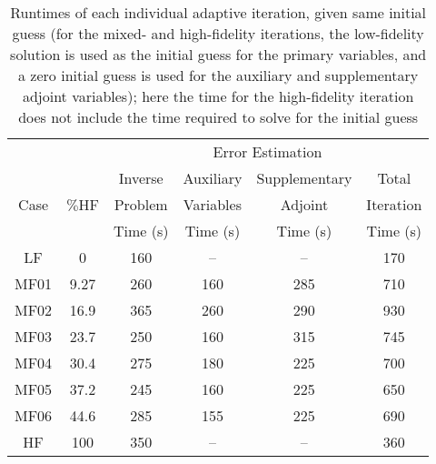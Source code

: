 \begin{table}
\caption{Runtimes of each individual adaptive iteration, given same initial guess (for the mixed- and high-fidelity iterations, the low-fidelity solution is used as the initial guess for the primary variables, and a zero initial guess is used for the auxiliary and supplementary adjoint variables); here the time for the high-fidelity iteration does not include the time required to solve for the initial guess}
\label{tab:ref3D_dainty_timebreak_sameinit}
\centering
\begin{tabular}{ccc|c|c|c}
\cline{4-5} 
 & & & \multicolumn{2}{|c|}{Error Estimation} & \\
\cline{1-6}
\multicolumn{1}{|c|}{\multirow{3}{*}{Case}} & \multicolumn{1}{|c|}{\multirow{3}{*}{$\%$HF}} & Inverse & Auxiliary & Supplementary & \multicolumn{1}{|c|}{Total} \\
\multicolumn{1}{|c|}{} & \multicolumn{1}{|c|}{} & Problem & Variables & Adjoint & \multicolumn{1}{|c|}{Iteration}\\
\multicolumn{1}{|c|}{} & \multicolumn{1}{|c|}{} & Time (s) &  Time (s) & Time (s) & \multicolumn{1}{|c|}{Time (s)}\\
\cline{1-6}
\multicolumn{1}{|c|}{LF}    & \multicolumn{1}{|c|}{0}     & 160 & -- & -- & \multicolumn{1}{|c|}{170} \\ \hline
\multicolumn{1}{|c|}{MF01}  & \multicolumn{1}{|c|}{9.27}  & 260 & 160 & 285 & \multicolumn{1}{|c|}{710} \\ \hline
\multicolumn{1}{|c|}{MF02}  & \multicolumn{1}{|c|}{16.9}  & 365 & 260 & 290 & \multicolumn{1}{|c|}{930} \\ \hline
\multicolumn{1}{|c|}{MF03}  & \multicolumn{1}{|c|}{23.7}  & 250 & 160 & 315 & \multicolumn{1}{|c|}{745} \\ \hline
\multicolumn{1}{|c|}{MF04}  & \multicolumn{1}{|c|}{30.4}  & 275 & 180 & 225 & \multicolumn{1}{|c|}{700} \\ \hline
\multicolumn{1}{|c|}{MF05}  & \multicolumn{1}{|c|}{37.2}  & 245 & 160 & 225 & \multicolumn{1}{|c|}{650} \\ \hline
\multicolumn{1}{|c|}{MF06}  & \multicolumn{1}{|c|}{44.6}  & 285 & 155 & 225 & \multicolumn{1}{|c|}{690} \\ \hline
\multicolumn{1}{|c|}{HF}    & \multicolumn{1}{|c|}{100}   & 350 & -- & -- & \multicolumn{1}{|c|}{360} \\ \hline
\end{tabular}
\end{table}
%
